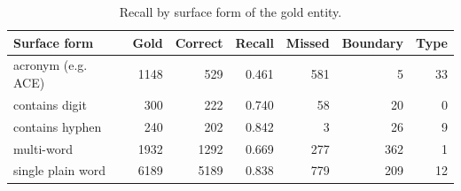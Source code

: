 \begin{table}[t]
\centering
\small
\caption{Recall by surface form of the gold entity.}
\label{tab:surface}
\begin{tabular}{lrrrrrr}
\toprule
Surface form & Gold & Correct & Recall & Missed & Boundary & Type \\
\midrule
acronym (e.g. ACE) & 1148 & 529 & 0.461 & 581 & 5 & 33 \\
contains digit & 300 & 222 & 0.740 & 58 & 20 & 0 \\
contains hyphen & 240 & 202 & 0.842 & 3 & 26 & 9 \\
multi-word & 1932 & 1292 & 0.669 & 277 & 362 & 1 \\
single plain word & 6189 & 5189 & 0.838 & 779 & 209 & 12 \\
\bottomrule
\end{tabular}
\end{table}
